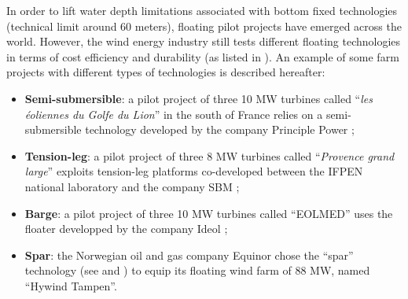 In order to lift water depth limitations associated with bottom fixed technologies (technical limit around 60 meters), floating pilot projects have emerged across the world. 
However, the wind energy industry still tests different floating technologies in terms of cost efficiency and durability (as listed in \citealp{mackinnon_2022_FOWT_table}). 
An example of some farm projects with different types of technologies is described hereafter: 
\begin{itemize}
    \item \textbf{Semi-submersible}: a pilot project of three 10 MW turbines called ``\textit{les éoliennes du Golfe du Lion}'' in the south of France relies on a semi-submersible technology developed by the company Principle Power \citep{cermelli_2018_windfloat};   
    \item \textbf{Tension-leg}: a pilot project of three 8 MW turbines called ``\textit{Provence grand large}'' exploits tension-leg platforms co-developed between the IFPEN national laboratory and the company SBM \citep{caille_2017_TPL_IFPEN}; 
    \item \textbf{Barge}: a pilot project of three 10 MW turbines called ``EOLMED'' uses the floater developped by the company Ideol \citep{guignier_2016_ideol}; 
    \item \textbf{Spar}: the Norwegian oil and gas company Equinor chose the ``spar'' technology (see  and \citealp{driscoll_2016_hywind}) to equip its floating wind farm of 88 MW, named ``Hywind Tampen''. 
\end{itemize}

